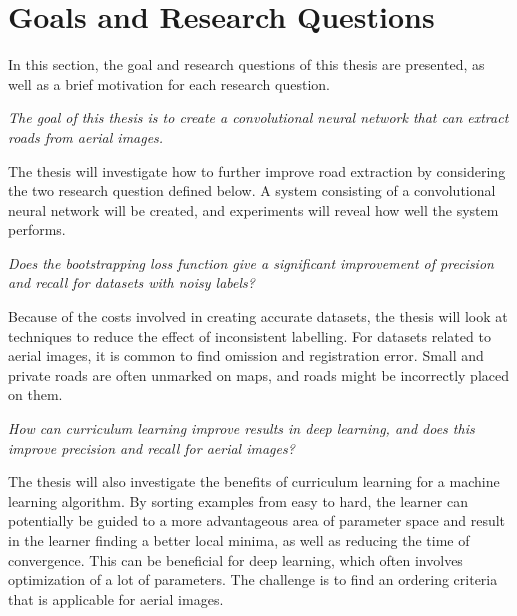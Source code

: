 \section{Goals and Research Questions}
\label{sec:Goals and Research Questions}
In this section, the goal and research questions of this thesis are presented, as well as a brief motivation for each research question.

\begin{description}[ style=nextline, leftmargin=1.5em, rightmargin=1.5em]
\item[Goal statement:]{\it The goal of this thesis is to create a convolutional neural network that can extract roads from aerial images.}
\end{description}

The thesis will investigate how to further improve road extraction by considering the two research question defined below. A system consisting of a convolutional neural network will be created, and experiments will reveal how well the system performs.

\begin{description}[ style=nextline, leftmargin=1.5em, rightmargin=1.5em]
\item[Research question 1:]{\it Does the bootstrapping loss function give a significant improvement of precision and recall for datasets with noisy labels?}
\end{description}

Because of the costs involved in creating accurate datasets, the thesis will look at techniques to reduce the effect of inconsistent labelling. For datasets related to aerial images, it is common to find omission and registration error. Small and private roads are often unmarked on maps, and roads might be incorrectly placed on them.

\begin{description}[ style=nextline, leftmargin=1.5em, rightmargin=1.5em]
\item[Research question 2:]{\it How can curriculum learning improve results in deep learning, and does this improve precision and recall for aerial images?}
\end{description}

The thesis will also investigate the benefits of curriculum learning for a machine learning algorithm. By sorting examples from easy to hard, the learner can potentially be guided to a more advantageous area of parameter space and result in the learner finding a better local minima, as well as reducing the time of convergence. This can be beneficial for deep learning, which often involves optimization of a lot of parameters. The challenge is to find an ordering criteria that is applicable for aerial images. 
